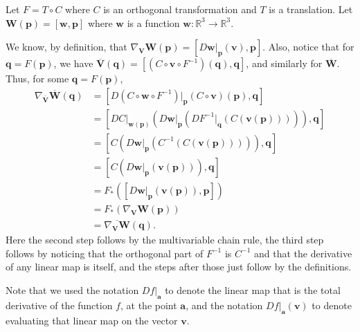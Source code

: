 \documentclass[12 pt, letterpaper]{hmcpset}
\begin{document}
\begin{solution}
	Let $F = T \circ C$ where $C$ is an orthogonal transformation and $T$ is a translation. Let $\mathbf{W}(\mathbf{p}) = [\mathbf{w}, \mathbf{p}]$ where $\mathbf{w}$ is a function $\mathbf{w} : \mathbb{R}^{3} \to \mathbb{R}^{3}$.

	We know, by definition, that $\nabla_{\mathbf{V}} \mathbf{W}(\mathbf{p}) = [D\mathbf{w} \Big |_{\mathbf{p}}(\mathbf{v}), \mathbf{p}]$. Also, notice that for $\mathbf{q} = F(\mathbf{p})$, we have $\overline{\mathbf{V}}(\mathbf{q}) = [(C \circ \mathbf{v} \circ F^{-1})(\mathbf{q}), \mathbf{q}]$, and similarly for $\overline{\mathbf{W}}$. Thus, for some $\mathbf{q} = F(\mathbf{p})$,
	\[
		\begin{split}
			\nabla_{\overline{\mathbf{V}}} \overline{\mathbf{W}}(\mathbf{q}) & = [D(C \circ \mathbf{w} \circ F^{-1}) \Big |_{\mathbf{p}} (C \circ \mathbf{v})(\mathbf{p}), \mathbf{q}] \\
									      & = \left [ DC \Big |_{\mathbf{w}(\mathbf{p})} \left ( D \mathbf{w} \Big |_{\mathbf{p}} \left ( DF^{-1} \Big |_{\mathbf{q}} (C(\mathbf{v}(\mathbf{p}))) \right ) \right ), \mathbf{q} \right ] \\
									      & = \left [ C \left ( D\mathbf{w} \Big |_{\mathbf{p}} (C^{-1}(C(\mathbf{v}(\mathbf{p})))) \right ), \mathbf{q} \right ] \\
									      & = \left [ C \left ( D \mathbf{w} \Big |_{\mathbf{p}} (\mathbf{v}(\mathbf{p})) \right ), \mathbf{q} \right ] \\
									      & = F_{*} \left ( \left [ D\mathbf{w} \Big |_{\mathbf{p}} (\mathbf{v}(\mathbf{p})), \mathbf{p} \right ] \right ) \\
									      & = F_{*}(\nabla_{\mathbf{V}} \mathbf{W}(\mathbf{p})) \\
									      & = \overline{\nabla_{\mathbf{V}} \mathbf{W}}{(\mathbf{q})}.
		\end{split}
	\]
	Here the second step follows by the multivariable chain rule, the third step follows by noticing that the orthogonal part of $F^{-1}$ is $C^{-1}$ and that the derivative of any linear map is itself, and the steps after those just follow by the definitions. 

	Note that we used the notation $Df \Big |_{\mathbf{a}}$ to denote the linear map that is the total derivative of the function $f$, at the point $\mathbf{a}$, and the notation $Df \Big |_{\mathbf{a}}(\mathbf{v})$ to denote evaluating that linear map on the vector $\mathbf{v}$.
\end{solution}
\end{document}
